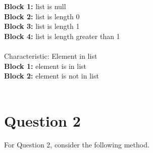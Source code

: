 \documentclass{article}
\begin{document}
\indent \textbf{Block 1:} list is null \\
\indent \textbf{Block 2:} list is length 0 \\
\indent \textbf{Block 3:} list is length 1 \\
\indent \textbf{Block 4:} list is length greater than 1 \\\\
Characteristic: Element in list \\
\indent \textbf{Block 1:} element is in list \\
\indent \textbf{Block 2:} element is not in list \\\\

\newpage
\section*{Question 2}

For Question 2, consider the following method.
\end{document}

